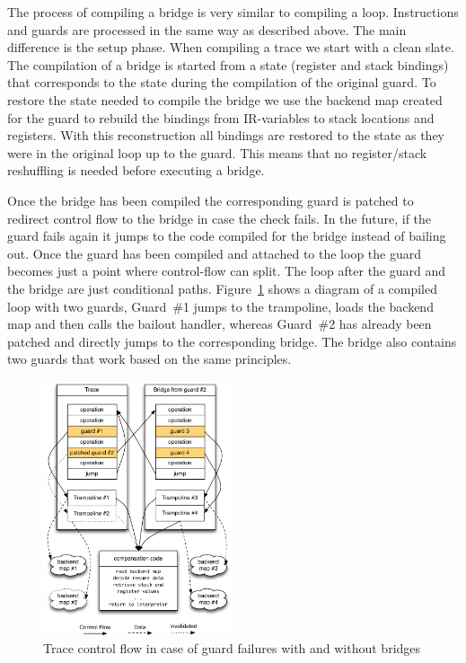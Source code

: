 \documentclass[10pt,preprint]{sigplanconf}
\begin{document}
The process of compiling a bridge is very similar to compiling a loop.
Instructions and guards are processed in the same way as described above. The
main difference is the setup phase. When compiling a trace we start with a clean
slate. The compilation of a bridge is started from a state (register and stack
bindings) that corresponds to the state during the compilation of the original
guard. To restore the state needed to compile the bridge we use the backend map
created for the guard to rebuild the bindings from IR-variables
to stack locations and registers.  With this
reconstruction all bindings are restored to the state as they were in the
original loop up to the guard. This means that no register/stack reshuffling is
needed before executing a bridge.

Once the bridge has been compiled the corresponding guard is
patched to redirect control flow to the bridge in case the check fails. In
the future, if the guard fails again it jumps to the code compiled for the bridge
instead of bailing out. Once the guard has been compiled and attached to the
loop the guard becomes just a point where control-flow can split. The loop
after the guard and the bridge are just conditional paths.
Figure~\ref{fig:trampoline} shows a diagram of a compiled loop with two guards,
Guard~\#1 jumps to the trampoline, loads the backend map and
then calls the bailout handler, whereas Guard~\#2 has already been patched
and directly jumps to the corresponding bridge. The bridge also contains two
guards that work based on the same principles.
\begin{figure}
\centering
\includegraphics[width=0.5\textwidth]{figures/loop_bridge.pdf}
\caption{Trace control flow in case of guard failures with and without bridges}
\label{fig:trampoline}
\end{figure}
\end{document}
